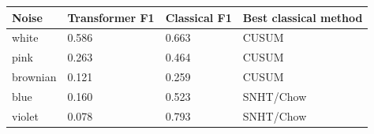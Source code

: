 \begin{tabular}{llll}
\toprule
Noise & Transformer F1 & Classical F1 & Best classical method \\
\midrule
white & 0.586 & 0.663 & CUSUM \\
pink & 0.263 & 0.464 & CUSUM \\
brownian & 0.121 & 0.259 & CUSUM \\
blue & 0.160 & 0.523 & SNHT/Chow \\
violet & 0.078 & 0.793 & SNHT/Chow \\
\bottomrule
\end{tabular}

